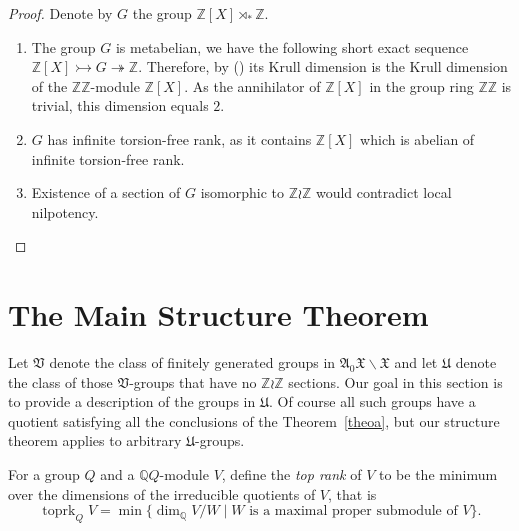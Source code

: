 \documentclass[11pt]{article}
\theoremstyle{definition}
\numberwithin{equation}{section}
\numberwithin{figure}{section}
\numberwithin{table}{section}
\renewcommand{\setminus}{\smallsetminus}
\newcommand{\Q}{\mathbb{Q}}
\newcommand{\Z}{\mathbb{Z}}
\newcommand{\mono}{\rightarrowtail}
\newcommand{\epi}{\twoheadrightarrow}
\DeclareMathOperator{\toprk}{toprk}
\newcommand*{\romanenumi}{\renewcommand*{\theenumi}{\roman{enumi}}}
\begin{document}
\begin{proof}
Denote by $G$ the group $\Z[X]\rtimes_*\Z$.
\begin{enumerate}\romanenumi
\item[{\eqref{list2.13.1}}] The group $G$ is metabelian, we have the following short exact sequence $\Z[X] \mono G \epi \Z$. Therefore, by (\cite[Proposition~2.24]{J}) its Krull dimension is the Krull dimension of the $\Z\Z$-module $\Z[X]$. As the annihilator of $\Z[X]$ in the group ring $\Z\Z$ is trivial, this dimension equals $2$.
\item[{\eqref{list2.13.2}}] $G$ has infinite torsion-free rank, as it contains $\Z[X]$ which is abelian of infinite torsion-free rank.
\item[{\eqref{list2.13.3}}] Existence of a section of $G$ isomorphic to $\Z\wr\Z$ would contradict local nilpotency.\qedhere
\end{enumerate}
\end{proof}



\section{The Main Structure Theorem}\label{sect-3}

Let $\mathfrak V$ denote the class of finitely generated groups in $\mathfrak A_0\mathfrak X\setminus\mathfrak X$ and let $\mathfrak U$ denote the class of those $\mathfrak V$-groups that have no $\Z\wr\Z$ sections. Our goal in this section is to provide a description of the groups in $\mathfrak U$. Of course all such groups have a quotient satisfying all the conclusions of the Theorem~\ref{theoa}, but our structure theorem applies to arbitrary $\mathfrak U$-groups.


For a group $Q$ and a $\Q Q$-module $V$, define the \emph{top rank} of $V$ to be the minimum over the dimensions of the irreducible quotients of $V$, that is
\[
\toprk_Q V = \min \{ \dim_\Q V/W \mid W \text{ is a maximal proper submodule of } V\}.
\]
\end{document}
